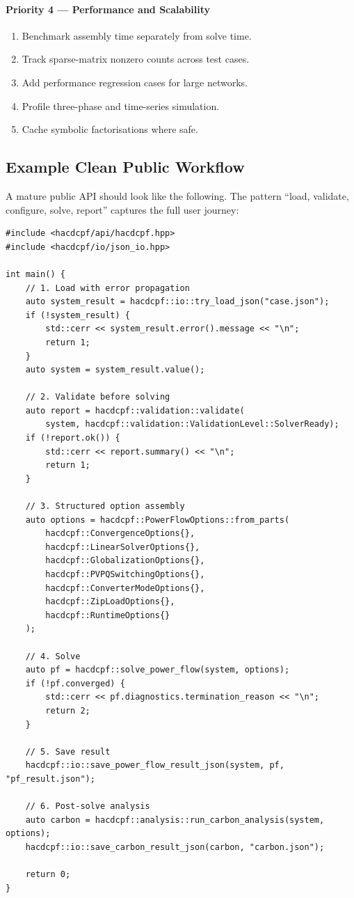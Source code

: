 \paragraph{Priority 4 --- Performance and Scalability}
\begin{enumerate}
  \item Benchmark assembly time separately from solve time.
  \item Track sparse-matrix nonzero counts across test cases.
  \item Add performance regression cases for large networks.
  \item Profile three-phase and time-series simulation.
  \item Cache symbolic factorisations where safe.
\end{enumerate}

\subsection{Example Clean Public Workflow}
\label{sec:example-workflow}

A mature public API should look like the following.  The pattern
``load, validate, configure, solve, report'' captures the full user
journey:

\begin{verbatim}
#include <hacdcpf/api/hacdcpf.hpp>
#include <hacdcpf/io/json_io.hpp>

int main() {
    // 1. Load with error propagation
    auto system_result = hacdcpf::io::try_load_json("case.json");
    if (!system_result) {
        std::cerr << system_result.error().message << "\n";
        return 1;
    }
    auto system = system_result.value();

    // 2. Validate before solving
    auto report = hacdcpf::validation::validate(
        system, hacdcpf::validation::ValidationLevel::SolverReady);
    if (!report.ok()) {
        std::cerr << report.summary() << "\n";
        return 1;
    }

    // 3. Structured option assembly
    auto options = hacdcpf::PowerFlowOptions::from_parts(
        hacdcpf::ConvergenceOptions{},
        hacdcpf::LinearSolverOptions{},
        hacdcpf::GlobalizationOptions{},
        hacdcpf::PVPQSwitchingOptions{},
        hacdcpf::ConverterModeOptions{},
        hacdcpf::ZipLoadOptions{},
        hacdcpf::RuntimeOptions{}
    );

    // 4. Solve
    auto pf = hacdcpf::solve_power_flow(system, options);
    if (!pf.converged) {
        std::cerr << pf.diagnostics.termination_reason << "\n";
        return 2;
    }

    // 5. Save result
    hacdcpf::io::save_power_flow_result_json(system, pf, "pf_result.json");

    // 6. Post-solve analysis
    auto carbon = hacdcpf::analysis::run_carbon_analysis(system, options);
    hacdcpf::io::save_carbon_result_json(carbon, "carbon.json");

    return 0;
}
\end{verbatim}

